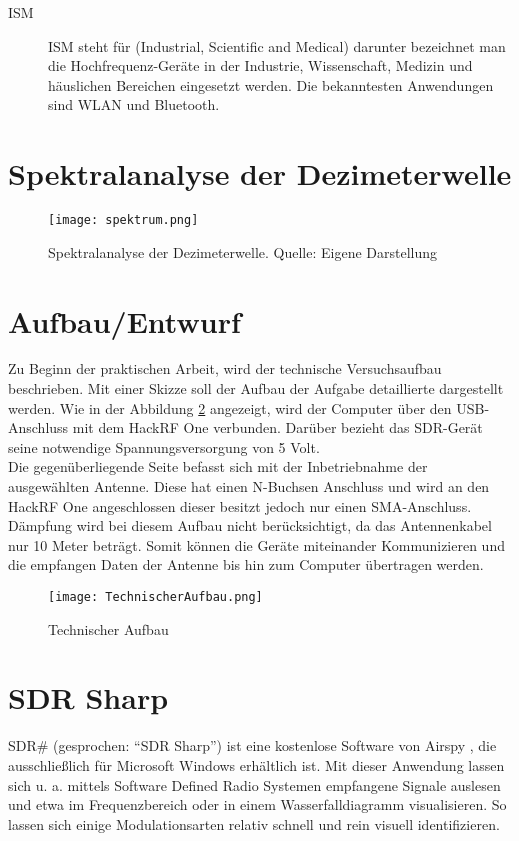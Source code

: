 \begin{description}
	\item [\ac{ISM}] {ISM steht für (Industrial, Scientific and Medical) darunter bezeichnet man die Hochfrequenz-Geräte in der Industrie, Wissenschaft, Medizin und häuslichen Bereichen eingesetzt werden. Die bekanntesten Anwendungen sind WLAN und Bluetooth.}
\end{description}

\section{Spektralanalyse der Dezimeterwelle}
\begin{figure}[ht]
	\centering
	\texttt{[image: spektrum.png]}
	\caption[Spektralanalyse der Dezimeterwelle]{Spektralanalyse der Dezimeterwelle. Quelle: Eigene Darstellung} 
	\label{spektralanalyse}
\end{figure}


\section{Aufbau/Entwurf}
Zu Beginn der praktischen Arbeit, wird der technische Versuchsaufbau beschrieben. Mit einer Skizze soll der Aufbau der Aufgabe detaillierte dargestellt werden. Wie in der Abbildung \ref{Technischer Aufbau} angezeigt, wird der Computer über den \ac{USB}-Anschluss mit dem HackRF One verbunden. Darüber bezieht das SDR-Gerät seine notwendige Spannungsversorgung von 5 Volt.\\
Die gegenüberliegende Seite befasst sich mit der Inbetriebnahme der ausgewählten Antenne. Diese hat einen N-Buchsen Anschluss und wird an den HackRF One angeschlossen dieser besitzt jedoch nur einen SMA-Anschluss. Dämpfung wird bei diesem Aufbau nicht berücksichtigt, da das Antennenkabel nur 10 Meter beträgt. Somit können die Geräte miteinander Kommunizieren und die empfangen Daten der Antenne bis hin zum Computer übertragen werden.  
\begin{figure}[H]
	\centering
	\texttt{[image: TechnischerAufbau.png]}
	\caption[Technischer Aufbau]{Technischer Aufbau} 
	\label{Technischer Aufbau}
\end{figure}

\section{SDR Sharp}
SDR\# (gesprochen: \enquote{SDR Sharp}) ist eine kostenlose Software von Airspy \cite{airspy:2018}, die ausschließlich für Microsoft Windows erhältlich ist. Mit dieser Anwendung lassen sich u. a. mittels Software Defined Radio Systemen empfangene Signale auslesen und etwa im Frequenzbereich oder in einem Wasserfalldiagramm visualisieren.
So lassen sich einige Modulationsarten relativ schnell und rein visuell identifizieren.

